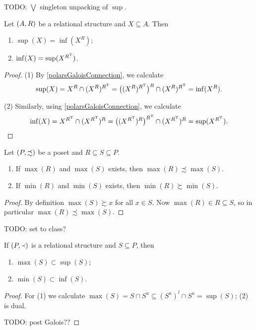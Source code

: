 TODO: $\bigvee$ singleton unpacking of $\sup$.

\begin{lemma} \label{supInfConnection}
Let $\sSet{A,R}$ be a relational structure and $X\subseteq A$. Then
\begin{enumerate}
\item $\sup(X) = \inf(X^R)$;
\item $\inf(X) = \sup(X^{R^{\mathrm{T}}})$.
\end{enumerate}
\end{lemma}
\begin{proof}
(1) By \ref{polarsGaloisConnection}, we calculate
\[ \sup(X) = X^R \cap (X^R)^{R^{\mathrm{T}}} = \big((X^R)^{R^{\mathrm{T}}}\big)^R \cap (X^R)^{R^{\mathrm{T}}} = \inf(X^R). \]

(2) Similarly, using \ref{polarsGaloisConnection}, we calculate
\[ \inf(X) = X^{R^{\mathrm{T}}} \cap (X^{R^{\mathrm{T}}})^{R} = \big((X^{R^{\mathrm{T}}})^{R}\big)^{R^{\mathrm{T}}} \cap (X^{R^{\mathrm{T}}})^{R} = \sup(X^{R^{\mathrm{T}}}). \]
\end{proof}

\begin{lemma} \label{greatestLeastElementsSubsetPoset}
Let $\sSet{P, \precsim}$ be a poset and $R\subseteq S\subseteq P$.
\begin{enumerate}
\item If $\max(R)$ and $\max(S)$ exists, then $\max(R) \precsim \max(S)$.
\item If $\min(R)$ and $\min(S)$ exists, then $\min(R) \succsim \min(S)$.
\end{enumerate}
\end{lemma}
\begin{proof}
By definition $\max(S) \succsim x$ for all $x \in S$. Now $\max(R)\in R\subseteq S$, so in particular $\max(R) \precsim \max(S)$.
\end{proof}

TODO: set to class?
\begin{lemma} \label{maxSupMinInf}
If $\sSet{P, \Yleft}$ is a relational structure and $S\subseteq P$, then
\begin{enumerate}
\item $\max(S)\subset \sup(S)$;
\item $\min(S)\subset \inf(S)$.
\end{enumerate}
\end{lemma}
\begin{proof}
For (1) we calculate $\max(S) = S \cap S^u \subseteq (S^u)^l \cap S^u = \sup(S)$; (2) is dual.

TODO: post Galois??
\end{proof}

